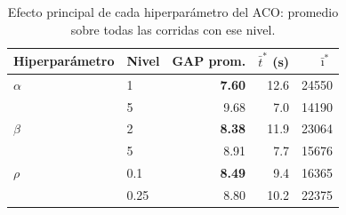 \begin{table}[htbp]
\centering
\small
\begin{tabular}{llrrr}
\toprule
Hiperparámetro & Nivel & GAP prom. & $\bar t^*$ (s) & $\bar\imath^*$ \\
\midrule
$\alpha$ & 1 & \textbf{7.60} & 12.6 & 24550 \\
 & 5 & 9.68 & 7.0 & 14190 \\
\midrule
$\beta$ & 2 & \textbf{8.38} & 11.9 & 23064 \\
 & 5 & 8.91 & 7.7 & 15676 \\
\midrule
$\rho$ & 0.1 & \textbf{8.49} & 9.4 & 16365 \\
 & 0.25 & 8.80 & 10.2 & 22375 \\
\bottomrule
\end{tabular}
\caption{Efecto principal de cada hiperparámetro del ACO: promedio sobre todas las corridas con ese nivel.}
\label{tab:efectos_aco}
\end{table}
